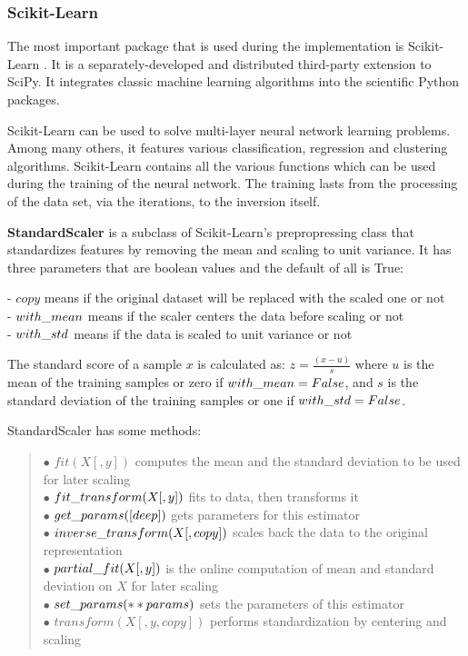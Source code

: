 \subsubsection{Scikit-Learn}

The most important package that is used during the implementation is Scikit-Learn \cite{Pedregosa2011ScikitlearnML}. It is a separately-developed and distributed third-party extension to SciPy. It integrates classic machine learning algorithms into the scientific Python packages. \smallskip

Scikit-Learn can be used to solve multi-layer neural network learning problems. Among many others, it features various classification, regression and clustering algorithms. Scikit-Learn contains all the various functions which can be used during the training of the neural network. The training lasts from the processing of the data set, via the iterations, to the inversion itself. \bigskip

\textbf{StandardScaler} is a subclass of Scikit-Learn's prepropressing class that standardizes features by removing the mean and scaling to unit variance. It has three parameters that are boolean values and the default of all is True: \smallskip

\noindent - $copy$ means if the original dataset will be replaced with the scaled one or not\\
- $with\char`_mean$ means if the scaler centers the data before scaling or not\\
- $with\char`_std$ means if the data is scaled to unit variance or not \medskip

The standard score of a sample $x$ is calculated as: $z = \frac{(x - u)}{s}$ where $u$ is the mean of the training samples or zero if $with\char`_mean=False$, and $s$ is the standard deviation of the training samples or one if $with\char`_std=False$. \medskip

\noindent StandardScaler has some methods:
\begin{verse}
	$\bullet$ $fit(X[, y])$ computes the mean and the standard deviation to be used for later scaling\\
	$\bullet$ $fit\char`_transform(X[, y])$ fits to data, then transforms it\\
	$\bullet$ $get\char`_params([deep])$ gets parameters for this estimator\\
	$\bullet$ $inverse\char`_transform(X[, copy])$ scales back the data to the original representation\\
	$\bullet$ $partial\char`_fit(X[, y])$ is the online computation of mean and standard deviation on $X$ for later scaling\\
	$\bullet$ $set\char`_params(**params)$ sets the parameters of this estimator\\
	$\bullet$ $transform(X[, y, copy])$ performs standardization by centering and scaling
\end{verse}\smallskip

